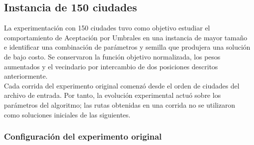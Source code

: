 \documentclass[12pt]{article}
\begin{document}
\subsection{Instancia de 150 ciudades}
\label{subsec:diseno150}

La experimentación con 150 ciudades tuvo como objetivo estudiar el
comportamiento de Aceptación por Umbrales en una instancia de mayor
tamaño e identificar una combinación de parámetros y semilla que
produjera una solución de bajo costo. Se conservaron la función
objetivo normalizada, los pesos aumentados y el vecindario por
intercambio de dos posiciones descritos anteriormente.
\\
Cada corrida del experimento original comenzó desde el orden de
ciudades del archivo de entrada. Por tanto, la evolución experimental
actuó sobre los parámetros del algoritmo; las rutas obtenidas en una
corrida no se utilizaron como soluciones iniciales de las siguientes.

\subsubsection{Configuración del experimento original}
\end{document}

